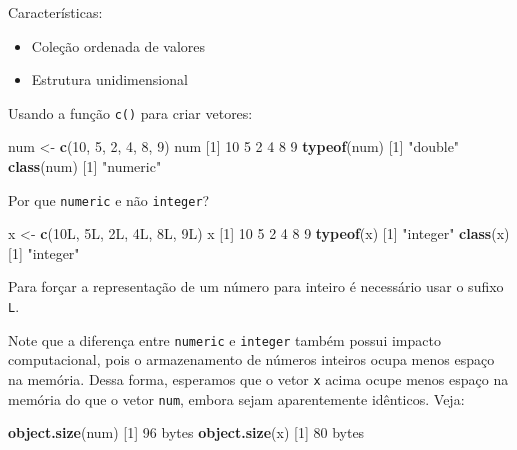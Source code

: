 \documentclass[10pt,a4paper]{book}
\newenvironment{Shaded}{\begin{snugshade}}{\end{snugshade}}
\newcommand{\KeywordTok}[1]{\textcolor[rgb]{0.13,0.29,0.53}{\textbf{#1}}}
\newcommand{\DecValTok}[1]{\textcolor[rgb]{0.00,0.00,0.81}{#1}}
\newcommand{\StringTok}[1]{\textcolor[rgb]{0.31,0.60,0.02}{#1}}
\newcommand{\NormalTok}[1]{#1}
\providecommand{\tightlist}{%
  \setlength{\itemsep}{0pt}\setlength{\parskip}{0pt}}
\begin{document}
Características:

\begin{itemize}
\tightlist
\item
  Coleção ordenada de valores
\item
  Estrutura unidimensional
\end{itemize}

Usando a função \texttt{c()} para criar vetores:

\begin{Shaded}
\begin{Highlighting}[]
\NormalTok{num <-}\StringTok{ }\KeywordTok{c}\NormalTok{(}\DecValTok{10}\NormalTok{, }\DecValTok{5}\NormalTok{, }\DecValTok{2}\NormalTok{, }\DecValTok{4}\NormalTok{, }\DecValTok{8}\NormalTok{, }\DecValTok{9}\NormalTok{)}
\NormalTok{num}
\NormalTok{[}\DecValTok{1}\NormalTok{] }\DecValTok{10}  \DecValTok{5}  \DecValTok{2}  \DecValTok{4}  \DecValTok{8}  \DecValTok{9}
\KeywordTok{typeof}\NormalTok{(num)}
\NormalTok{[}\DecValTok{1}\NormalTok{] }\StringTok{"double"}
\KeywordTok{class}\NormalTok{(num)}
\NormalTok{[}\DecValTok{1}\NormalTok{] }\StringTok{"numeric"}
\end{Highlighting}
\end{Shaded}

Por que \texttt{numeric} e não \texttt{integer}?

\begin{Shaded}
\begin{Highlighting}[]
\NormalTok{x <-}\StringTok{ }\KeywordTok{c}\NormalTok{(10L, 5L, 2L, 4L, 8L, 9L)}
\NormalTok{x}
\NormalTok{[}\DecValTok{1}\NormalTok{] }\DecValTok{10}  \DecValTok{5}  \DecValTok{2}  \DecValTok{4}  \DecValTok{8}  \DecValTok{9}
\KeywordTok{typeof}\NormalTok{(x)}
\NormalTok{[}\DecValTok{1}\NormalTok{] }\StringTok{"integer"}
\KeywordTok{class}\NormalTok{(x)}
\NormalTok{[}\DecValTok{1}\NormalTok{] }\StringTok{"integer"}
\end{Highlighting}
\end{Shaded}

Para forçar a representação de um número para inteiro é necessário usar
o sufixo \texttt{L}.

Note que a diferença entre \texttt{numeric} e \texttt{integer} também
possui impacto computacional, pois o armazenamento de números inteiros
ocupa menos espaço na memória. Dessa forma, esperamos que o vetor
\texttt{x} acima ocupe menos espaço na memória do que o vetor
\texttt{num}, embora sejam aparentemente idênticos. Veja:

\begin{Shaded}
\begin{Highlighting}[]
\KeywordTok{object.size}\NormalTok{(num)}
\NormalTok{[}\DecValTok{1}\NormalTok{] }\DecValTok{96}\NormalTok{ bytes}
\KeywordTok{object.size}\NormalTok{(x)}
\NormalTok{[}\DecValTok{1}\NormalTok{] }\DecValTok{80}\NormalTok{ bytes}
\end{Highlighting}
\end{Shaded}
\end{document}
